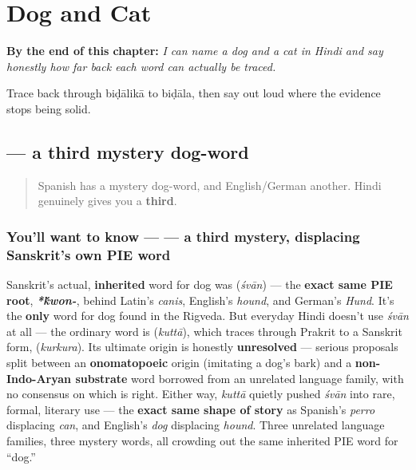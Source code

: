 
\chapter{Dog and Cat}
\label{ch:hi-dog-and-cat}

\begin{chapteropening}
\textbf{By the end of this chapter:} \emph{I can name a dog and a cat in Hindi and say honestly how far back each word can actually be traced.}

Trace  back through biḍālikā to biḍāla, then say out loud where the evidence stops being solid.
\end{chapteropening}

\section[\texorpdfstring{\hi{कुत्ता} (kuttā)}{कुत्ता (kuttā)}]{ — a third mystery dog-word}

\label{lesson:HI-C23-kutta-billi}



\begin{quote}
Spanish has a mystery dog-word, and English/German another. Hindi genuinely gives you a \textbf{third}.
\end{quote}

\subsection*{You'll want to know —  — a third mystery, displacing Sanskrit's own PIE word}
Sanskrit's actual, \textbf{inherited} word for dog was \textbf{} (\emph{śvān}) — the \textbf{exact same PIE root}, \emph{\textbf{*\'{k}won-}}, behind Latin's \emph{canis}, English's \emph{hound}, and German's \emph{Hund}. It's the \textbf{only} word for dog found in the Rigveda. But everyday Hindi doesn't use \emph{śvān} at all — the ordinary word is \textbf{} (\emph{kuttā}), which traces through Prakrit to a Sanskrit form, \textbf{} (\emph{kurkura}). Its ultimate origin is honestly \textbf{unresolved} — serious proposals split between an \textbf{onomatopoeic} origin (imitating a dog's bark) and a \textbf{non-Indo-Aryan substrate} word borrowed from an unrelated language family, with no consensus on which is right. Either way, \emph{kuttā} quietly pushed \emph{śvān} into rare, formal, literary use — the \textbf{exact same shape of story} as Spanish's \emph{perro} displacing \emph{can}, and English's \emph{dog} displacing \emph{hound}. Three unrelated language families, three mystery words, all crowding out the same inherited PIE word for \textquotedblleft{}dog.\textquotedblright{}

